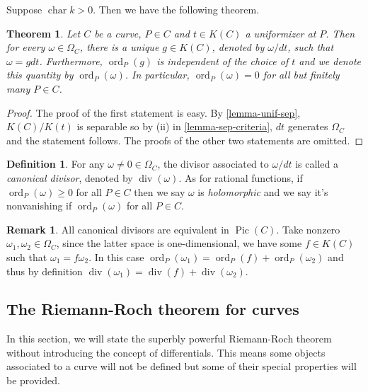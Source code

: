 \documentclass[12pt]{article}
\newtheorem{theorem}{Theorem}[subsection]
\theoremstyle{remark}
\theoremstyle{definition}
\newtheorem{remark}{Remark}[subsection]
\newtheorem{definition}{Definition}[subsection]
\newcommand{\ord}[0]{\operatorname{ord}}
\newcommand{\w}[0]{\omega}
\newcommand{\pdiv}[0]{\operatorname{div}}
\newcommand{\Pic}[0]{\operatorname{Pic}}
\begin{document}
            Suppose $\operatorname{char}k>0$. Then we have the following theorem.
            \begin{theorem}
               Let $C$ be a curve, $P\in C$ and $t\in K(C)$ a uniformizer at $P$. Then for every $\w\in\Omega_C$, there is a unique $g\in K(C)$, denoted by $\w/dt$, such that $\w=gdt$. Furthermore, $\ord_P(g)$ is independent of the choice of $t$ and we denote this quantity by $\ord_P(\w)$. In particular, $\ord_P(\w)=0$ for all but finitely many $P\in C$.
            \end{theorem}
            \begin{proof}
                The proof of the first statement is easy. By \autoref{lemma-unif-sep}, $K(C)/K(t)$ is separable so by (ii) in \autoref{lemma-sep-criteria}, $dt$ generates $\Omega_C$ and the statement follows. The proofs of the other two statements are omitted.
            \end{proof}
            \begin{definition}
                For any $\w\neq 0\in\Omega_C$, the divisor associated to $\w/dt$ is called a \textit{canonical divisor}, denoted by $\pdiv(\w)$. As for rational functions, if $\ord_P(\w)\geqslant 0$ for all $P\in C$ then we say $\w$ is \textit{holomorphic} and we say it's nonvanishing if $\ord_P(\w)$ for all $P\in C$.
            \end{definition}
            \begin{remark}\label{remark-canonical-equiv}
                All canonical divisors are equivalent in $\Pic(C)$. Take nonzero $\w_1,\w_2\in\Omega_C$, since the latter space is one-dimensional, we have some $f\in K(C)$ such that $\w_1=f\w_2$. In this case $\ord_P(\w_1)=\ord_P(f)+\ord_P(\w_2)$ and thus by definition $\pdiv(\w_1)=\pdiv(f)+\pdiv(\w_2)$.
            \end{remark}
        
        
        
        \subsection{The Riemann-Roch theorem for curves}
            In this section, we will state the superbly powerful Riemann-Roch theorem without introducing the concept of differentials. This means some objects associated to a curve will not be defined but some of their special properties will be provided.
    
\end{document}
